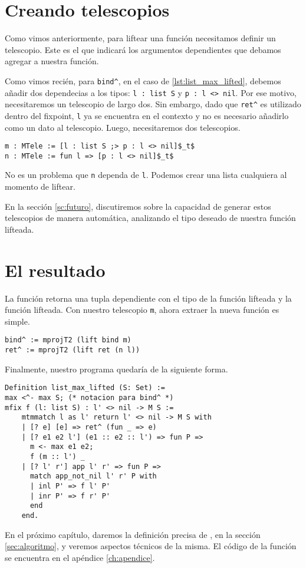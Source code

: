 \section{Creando telescopios}

Como vimos anteriormente, para liftear una función necesitamos definir un telescopio. Este es el que indicará los argumentos dependientes que debamos agregar a nuestra función.

Como vimos recién, para \lstinline{bind^}, en el caso de \ref{lst:list_max_lifted}, debemos añadir dos dependecias a los tipos: \lstinline{l : list S} y \lstinline{p : l <> nil}.
Por ese motivo, necesitaremos un telescopio de largo dos.
Sin embargo, dado que \lstinline{ret^} es utilizado dentro del fixpoint, \lstinline{l} ya se encuentra en el contexto y no es necesario añadirlo como un dato al telescopio. Luego, necesitaremos dos telescopios.

\begin{lstlisting}[frame=tb,caption={Telescopio para \lstinline{list_max}},label=lst:list_max_tele]
m : MTele := [l : list S ;> p : l <> nil]$_t$
n : MTele := fun l => [p : l <> nil]$_t$
\end{lstlisting}

No es un problema que \lstinline{n} dependa de \lstinline{l}. Podemos crear una lista cualquiera al momento de liftear.

En la sección \ref{sc:futuro}, discutiremos sobre la capacidad de generar estos telescopios de manera automática, analizando el tipo deseado de nuestra función lifteada.

\section{El resultado}

La función \lift retorna una tupla dependiente con el tipo de la función lifteada y la función lifteada.
Con nuestro telescopio \lstinline{m}, ahora extraer la nueva función es simple.

\begin{lstlisting}[float=h,frame=tb,caption={Lifteando \lstinline{ret} y \lstinline{bind}}]
bind^ := mprojT2 (lift bind m)
ret^ := mprojT2 (lift ret (n l))
\end{lstlisting}

Finalmente, nuestro programa quedaría de la siguiente forma.

\begin{lstlisting}[float=h,frame=tb,caption=Versión final de \lstinline{list_max}]
Definition list_max_lifted (S: Set) :=
max <^- max S; (* notacion para bind^ *)
mfix f (l: list S) : l' <> nil -> M S :=
    mtmmatch l as l' return l' <> nil -> M S with
    | [? e] [e] => ret^ (fun _ => e)
    | [? e1 e2 l'] (e1 :: e2 :: l') => fun P =>
      m <- max e1 e2;
      f (m :: l') _
    | [? l' r'] app l' r' => fun P =>
      match app_not_nil l' r' P with
      | inl P' => f l' P'
      | inr P' => f r' P'
      end
    end.
\end{lstlisting}

En el próximo capítulo, daremos la definición precisa de \lift, en la sección \ref{sec:algoritmo}, y veremos aspectos técnicos de la misma.
El código de la función se encuentra en el apéndice \ref{ch:apendice}.
